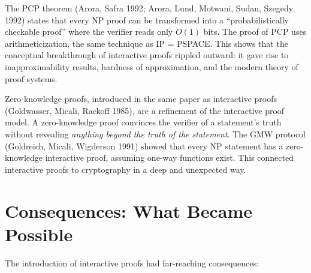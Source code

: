 The PCP theorem (Arora, Safra 1992; Arora, Lund, Motwani, Sudan, Szegedy 1992) states that every NP proof can be transformed into a ``probabilistically checkable proof'' where the verifier reads only $O(1)$ bits. The proof of PCP uses arithmeticization, the same technique as IP = PSPACE. This shows that the conceptual breakthrough of interactive proofs rippled outward: it gave rise to inapproximability results, hardness of approximation, and the modern theory of proof systems.

Zero-knowledge proofs, introduced in the same paper as interactive proofs (Goldwasser, Micali, Rackoff 1985), are a refinement of the interactive proof model. A zero-knowledge proof convinces the verifier of a statement's truth without revealing \emph{anything beyond the truth of the statement}. The GMW protocol (Goldreich, Micali, Wigderson 1991) showed that every NP statement has a zero-knowledge interactive proof, assuming one-way functions exist. This connected interactive proofs to cryptography in a deep and unexpected way.

\section{Consequences: What Became Possible}
\label{sec:ip:consequences}

The introduction of interactive proofs had far-reaching consequences:


